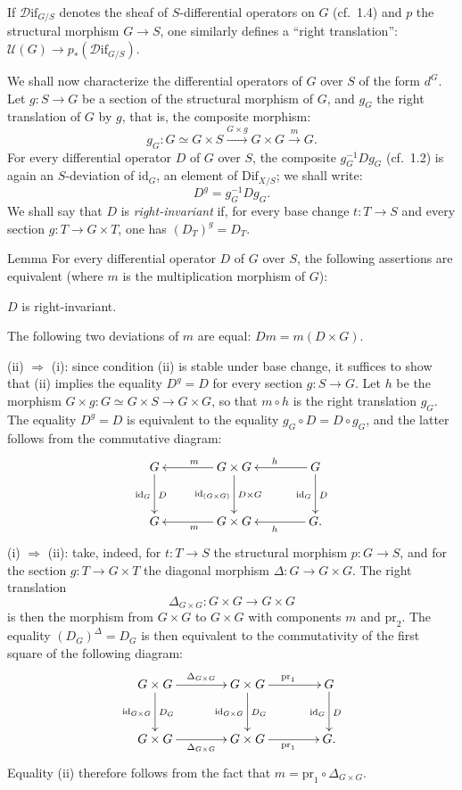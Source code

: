 If $\mathscr D\!\mathrm{if}_{G/S}$ denotes the sheaf of $S$-differential operators on $G$ (cf.\ 1.4) and $p$ the structural morphism $G\to S$, one similarly defines a ``right translation'': $\mathscr U(G)\to p_*(\mathscr D\!\mathrm{if}_{G/S})$.

We shall now characterize the differential operators of $G$ over $S$ of the form $d^G$. Let $g:S\to G$ be a section of the structural morphism of $G$, and $g_G$ the right translation of $G$ by $g$, that is, the composite morphism:
\[
g_G:G\simeq G\times S\xrightarrow{G\times g}G\times G\xrightarrow{m}G.
\]
For every differential operator $D$ of $G$ over $S$, the composite $g_G^{-1}Dg_G$ (cf.\ 1.2) is again an $S$-deviation of $\mathrm{id}_G$, \ie an element of $\mathrm{Dif}_{X/S}$; we shall write:
\[
D^g=g_G^{-1}Dg_G.
\]
We shall say that $D$ is \emph{right-invariant} if, for every base change $t:T\to S$ and every section $g:T\to G\times T$, one has $(D_T)^g=D_T$.

\begin{enonce}{Lemma}{}
For every differential operator $D$ of $G$ over $S$, the following assertions are equivalent (where $m$ is the multiplication morphism of $G$):
\begin{enumeratei}
\item $D$ is right-invariant.
\item The following two deviations of $m$ are equal: $Dm=m(D\times G)$.
\end{enumeratei}
\end{enonce}

\noindent (ii) $\Rightarrow$ (i): since condition (ii) is stable under base change, it suffices to show that (ii) implies the equality $D^g=D$ for every section $g:S\to G$. Let $h$ be the morphism $G\times g:G\simeq G\times S\to G\times G$, so that $m\circ h$ is the right translation $g_G$. The equality $D^g=D$ is equivalent to the equality $g_G\circ D=D\circ g_G$, and the latter follows from the commutative diagram:
\[
\xymatrix@C=4em@R=3em{G\ar[d]^D_{\mathrm{id}_G}&G\times G\ar[l]_m\ar[d]^{D\times G}_{\mathrm{id}_{(G\times G)}}&G\ar[l]_h\ar[d]^D_{\mathrm{id}_G}\\
G&G\times G\ar[l]^m&G\ar[l]^h.}
\]
\noindent (i) $\Rightarrow$ (ii): take, indeed, for $t:T\to S$ the structural morphism $p:G\to S$, and for the section $g:T\to G\times T$ the diagonal morphism $\Delta:G\to G\times G$. The right translation
\[
\Delta_{G\times G}:G\times G\longrightarrow G\times G
\]
is then the morphism from $G\times G$ to $G\times G$ with components $m$ and $\mathrm{pr}_2$. The equality $(D_G)^\Delta=D_G$ is then equivalent to the commutativity of the first square of the following diagram:
\[
\xymatrix@C=4em@R=3em{G\times G\ar[r]^{\Delta_{G\times G}}\ar[d]^{D_G}_{\mathrm{id}_{G\times G}}&G\times G\ar[r]^{\mathrm{pr}_1}\ar[d]^{D_G}_{\mathrm{id}_{G\times G}}&G\ar[d]^D_{\mathrm{id}_G}\\
G\times G\ar[r]_{\Delta_{G\times G}}&G\times G\ar[r]_{\mathrm{pr}_1}&G.}
\]
Equality (ii) therefore follows from the fact that $m=\mathrm{pr}_1\circ\Delta_{G\times G}$.

